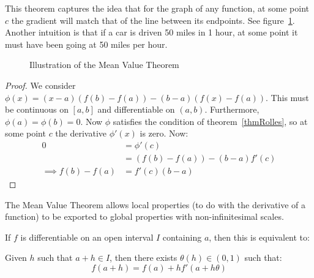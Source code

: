 \documentclass[../Main.tex]{subfiles}
\begin{document}
This theorem captures the idea that for the graph of any function, at some point $c$ the gradient will match that of the line between its endpoints. See figure~\ref{figMeanValue}. Another intuition is that if a car is driven 50 miles in 1 hour, at some point it must have been going at 50 miles per hour.
\begin{figure}[ht]
    \centering
    \caption{Illustration of the Mean Value Theorem}
    \label{figMeanValue}
\end{figure}
\begin{proof}
    We consider $\phi(x) = (x - a)(f(b) - f(a)) - (b - a)(f(x) - f(a))$. This must be continuous on $[a, b]$ and differentiable on $(a, b)$. Furthermore, $\phi(a) = \phi(b) = 0$. Now $\phi$ satisfies the condition of theorem~\ref{thmRolles}, so at some point $c$ the derivative $\phi'(x)$ is zero. Now:
    \begin{align*}
        0 &= \phi'(c) \\
        &= (f(b) - f(a)) - (b - a)f'(c) \\
        \implies f(b) - f(a) &= f'(c)(b - a)
    \end{align*}
\end{proof}
\begin{remark}
    The Mean Value Theorem allows local properties (to do with the derivative of a function) to be exported to global properties with non-infinitesimal scales.
\end{remark}
\begin{corollary}
    If $f$ is differentiable on an open interval $I$ containing $a$, then this is equivalent to:\par
    Given $h$ such that $a + h \in I$, then there exists $\theta(h) \in (0, 1)$ such that:
    \begin{equation*}
        f(a + h) = f(a) + hf'(a + h\theta)
    \end{equation*}
\end{corollary}
\end{document}
